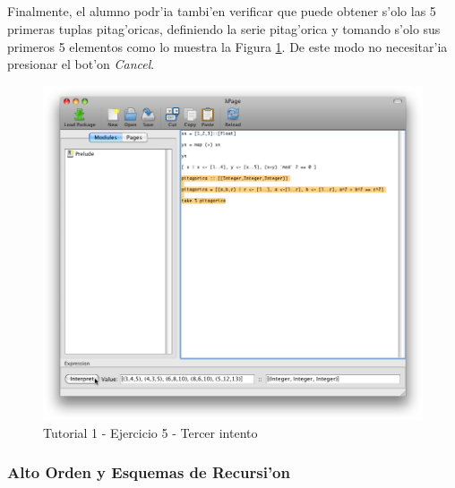 \documentclass[a4paper]{article}
\begin{document}
\subparagraph{}Finalmente, el alumno podr'ia tambi'en verificar que puede obtener s'olo las 5 primeras tuplas pitag'oricas, definiendo la serie pitag'orica y tomando s'olo sus primeros 5 elementos como lo muestra la Figura \ref{tut105}.  De este modo no necesitar'ia presionar el bot'on \textsl{Cancel}.
\begin{figure}[hp]
	\begin{center}
        	\includegraphics[width=.75\textwidth]{pictures/tut1/05}
		\caption{Tutorial 1 - Ejercicio 5 - Tercer intento}
		\label{tut105}
	\end{center}
\end{figure}

\newpage
\subsubsection{Alto Orden y Esquemas de Recursi'on}
\end{document}
